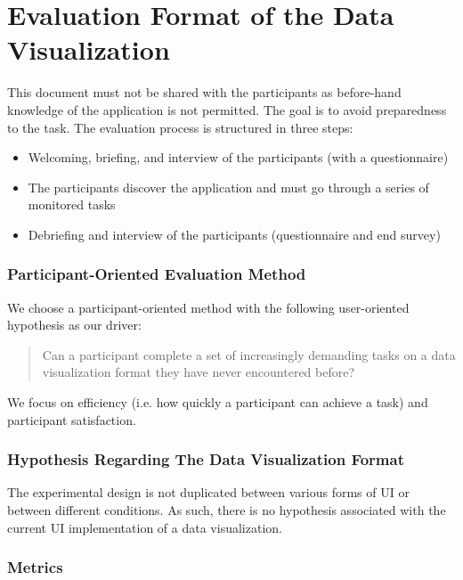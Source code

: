 \documentclass[twocolumn, letterpaper,13pt]{scrartcl}
\begin{document}
    \section{Evaluation Format of the Data Visualization}

    This document must not be shared with the participants as before-hand knowledge of the application is not permitted. The goal is to avoid preparedness to the task.
    \newline
    \newline
    The evaluation process is structured in three steps:
    \begin{itemize}
        \item Welcoming, briefing, and interview of the participants (with a questionnaire)
        \item The participants discover the application and must go through a series of monitored tasks
        \item Debriefing and interview of the participants (questionnaire and end survey)
    \end{itemize}

    \subsubsection*{Participant-Oriented Evaluation Method}
    
    We choose a participant-oriented method with the following user-oriented hypothesis as our driver: 
    
    \begin{quote}
        Can a participant complete a set of increasingly demanding tasks on a data visualization format they have never encountered before?
    \end{quote}
    
    We focus on efficiency (i.e. how quickly a participant can achieve a task) and participant satisfaction.

    \subsubsection*{Hypothesis Regarding The Data Visualization Format}
 
    The experimental design is not duplicated between various forms of UI or between different conditions. As such, there is no hypothesis associated with the current UI implementation of a data visualization.
 
    \subsubsection*{Metrics}
    
\end{document}
